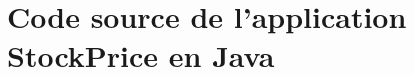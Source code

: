 
\chapter{Code source de l'application StockPrice en Java}
\label{sourceCodeStockPriceJava.ann}



\newpage
